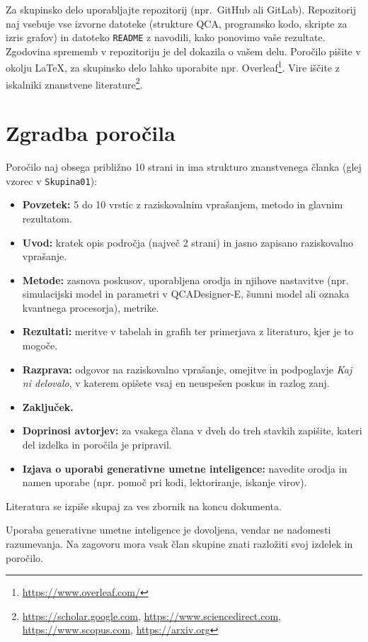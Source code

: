 Za skupinsko delo uporabljajte repozitorij (npr.\ GitHub ali GitLab). Repozitorij naj vsebuje vse izvorne datoteke (strukture QCA, programsko kodo, skripte za izris grafov) in datoteko \texttt{README} z navodili, kako ponovimo vaše rezultate. Zgodovina sprememb v repozitoriju je del dokazila o vašem delu. Poročilo pišite v okolju \LaTeX, za skupinsko delo lahko uporabite npr. Overleaf\footnote{\url{https://www.overleaf.com/}}. Vire iščite z iskalniki znanstvene literature\footnote{\url{https://scholar.google.com}, \url{https://www.sciencedirect.com}, \url{https://www.scopus.com}, \url{https://arxiv.org}}.


\section*{Zgradba poročila}

Poročilo naj obsega približno 10 strani in ima strukturo znanstvenega članka (glej vzorec v \texttt{Skupina01}):
\begin{itemize}
\item \textbf{Povzetek:} 5 do 10 vrstic z raziskovalnim vprašanjem, metodo in glavnim rezultatom.
\item \textbf{Uvod:} kratek opis področja (največ 2 strani) in jasno zapisano raziskovalno vprašanje.
\item \textbf{Metode:} zasnova poskusov, uporabljena orodja in njihove nastavitve (npr. simulacijski model in parametri v QCADesigner-E, šumni model ali oznaka kvantnega procesorja), metrike.
\item \textbf{Rezultati:} meritve v tabelah in grafih ter primerjava z literaturo, kjer je to mogoče.
\item \textbf{Razprava:} odgovor na raziskovalno vprašanje, omejitve in podpoglavje \emph{Kaj ni delovalo}, v katerem opišete vsaj en neuspešen poskus in razlog zanj.
\item \textbf{Zaključek.}
\item \textbf{Doprinosi avtorjev:} za vsakega člana v dveh do treh stavkih zapišite, kateri del izdelka in poročila je pripravil.
\item \textbf{Izjava o uporabi generativne umetne inteligence:} navedite orodja in namen uporabe (npr. pomoč pri kodi, lektoriranje, iskanje virov).
\end{itemize}
Literatura se izpiše skupaj za ves zbornik na koncu dokumenta.

Uporaba generativne umetne inteligence je dovoljena, vendar ne nadomesti razumevanja. Na zagovoru mora vsak član skupine znati razložiti svoj izdelek in poročilo.


